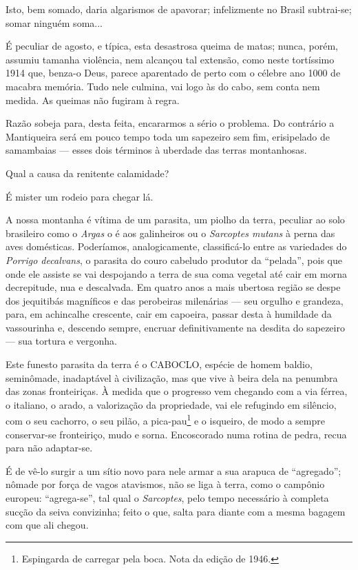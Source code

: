 Isto, bem somado, daria algarismos de apavorar; infelizmente no Brasil
subtrai-se; somar ninguém soma...

É peculiar de agosto, e típica, esta desastrosa queima de matas; nunca,
porém, assumiu tamanha violência, nem alcançou tal extensão, como neste
tortíssimo 1914 que, benza-o Deus, parece aparentado de perto com o
célebre ano 1000 de macabra memória. Tudo nele culmina, vai logo às do
cabo, sem conta nem medida. As queimas não fugiram à regra.

Razão sobeja para, desta feita, encararmos a sério o problema. Do
contrário a Mantiqueira será em pouco tempo toda um sapezeiro sem fim,
erisipelado de samambaias --- esses dois términos à uberdade das terras
montanhosas.

Qual a causa da renitente calamidade?

É mister um rodeio para chegar lá.

A nossa montanha é vítima de um parasita, um piolho da terra, peculiar
ao solo brasileiro como o \emph{Argas} o é aos galinheiros ou o
\emph{Sarcoptes mutans} à perna das aves domésticas. Poderíamos,
analogicamente, classificá-lo entre as variedades do \emph{Porrigo
decalvans}, o parasita do couro cabeludo produtor da ``pelada'', pois
que onde ele assiste se vai despojando a terra de sua coma vegetal até
cair em morna decrepitude, nua e descalvada. Em quatro anos a mais
ubertosa região se despe dos jequitibás magníficos e das perobeiras
milenárias --- seu orgulho e grandeza, para, em achincalhe crescente,
cair em capoeira, passar desta à humildade da vassourinha e, descendo
sempre, encruar definitivamente na desdita do sapezeiro --- sua tortura
e vergonha.

Este funesto parasita da terra é o CABOCLO, espécie de homem baldio,
seminômade, inadaptável à civilização, mas que vive à beira dela na
penumbra das zonas fronteiriças. À medida que o progresso vem chegando
com a via férrea, o italiano, o arado, a valorização da propriedade, vai
ele refugindo em silêncio, com o seu cachorro, o seu pilão, a
pica-pau\footnote{Espingarda de carregar pela boca. Nota da edição de
  1946.} e o isqueiro, de modo a sempre conservar-se fronteiriço, mudo e
sorna. Encoscorado numa rotina de pedra, recua para não adaptar-se.

É de vê-lo surgir a um sítio novo para nele armar a sua arapuca de
``agregado''; nômade por força de vagos atavismos, não se liga à terra,
como o campônio europeu: ``agrega-se'', tal qual o \emph{Sarcoptes},
pelo tempo necessário à completa sucção da seiva convizinha; feito o
que, salta para diante com a mesma bagagem com que ali chegou.

